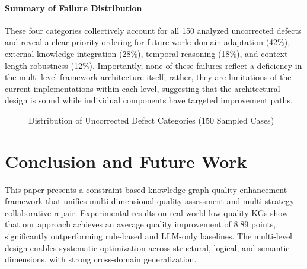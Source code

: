 \documentclass[runningheads]{llncs}
\begin{document}
\paragraph{Summary of Failure Distribution}
These four categories collectively account for all 150 analyzed uncorrected defects and reveal a clear priority ordering for future work: domain adaptation (42\%), external knowledge integration (28\%), temporal reasoning (18\%), and context-length robustness (12\%). Importantly, none of these failures reflect a deficiency in the multi-level framework architecture itself; rather, they are limitations of the current implementations within each level, suggesting that the architectural design is sound while individual components have targeted improvement paths.

\begin{figure}[H]
    \centering
    \caption{Distribution of Uncorrected Defect Categories (150 Sampled Cases)}
    \label{fig:failure_dist}
\end{figure}

\section{Conclusion and Future Work}

This paper presents a constraint-based knowledge graph quality enhancement framework
that unifies multi-dimensional quality assessment and multi-strategy collaborative repair.
Experimental results on real-world low-quality KGs show that our approach
achieves an average quality improvement of 8.89 points,
significantly outperforming rule-based and LLM-only baselines.
The multi-level design enables systematic optimization across
structural, logical, and semantic dimensions, with strong cross-domain generalization.
\end{document}
